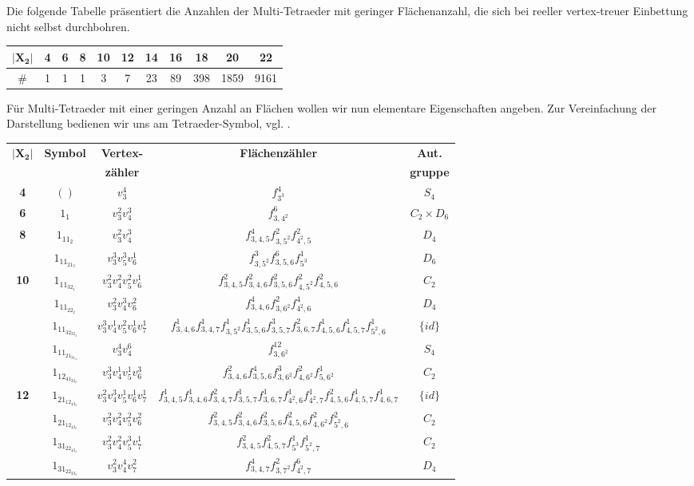 \documentclass[12pt,titlepage,twoside,cleardoublepage]{article}
\theoremstyle{nummermitklammern}
\numberwithin{equation}{section}
\begin{document}
Die folgende Tabelle präsentiert die Anzahlen der Multi-Tetraeder mit geringer Flächenanzahl, die sich bei reeller vertex-treuer Einbettung nicht selbst durchbohren.  
\begin{center}
\begin{tabular}{|c|c|c|c|c|c|c|c|c|c|c|}
\hline
$\vert\textbf{X}_{\textbf{2}}\vert$&\textbf{4}&\textbf{6}&\textbf{8}&\textbf{10}&\textbf{12}&\textbf{14}&\textbf{16}&\textbf{18}&\textbf{20}&\textbf{22}\\
\hline
$\#$&1&1&1&3&7&23&89&398&1859&9161\\
\hline
\end{tabular}
\end{center} 
Für Multi-Tetraeder mit einer geringen Anzahl an Flächen wollen wir nun elementare Eigenschaften angeben. Zur Vereinfachung der Darstellung bedienen wir uns am Tetraeder-Symbol, vgl. \cite{simp}.
\begin{center}
{\footnotesize
\begin{tabular}[h]{|c|c|c|c|c|}
\hline
$\vert\textbf{X}_{\textbf{2}}\vert$ & \textbf{Symbol} & \textbf{Vertex-}& \textbf{Flächenzähler} & \textbf{Aut.} \\
 &&\textbf{zähler}&& \textbf{gruppe}\\
\hline
\textbf{4} & $()$ &$v_3^4$ & $f_{3^3}^4$ &$S_4$\\
\hline
\textbf{6} & $1_1$ & $v_3^2v_4^3$&$f^6_{3,4^2}$ &$C_2\times D_6$\\
\hline
\textbf{8} & $1_11_2$&$ v_3^2v_4^3$& $f^4_{3,4,5}f^2_{3,5^2}f^2_{4^2,5}$ & $D_4$\\
\hline  
  & $1_11_21_3$ & $v_3^3v_5^3v_6^1$& $f^3_{3,5^2}f^6_{3,5,6}f^1_{5^3}$ &$D_6$\\
\textbf{10}& $1_11_32_1$ &$v_3^2v_4^2v_5^2v_6^1$ & $f^2_{3,4,5}f^2_{3,4,6}f^2_{3,5,6}f^2_{4,5^2}f^2_{4,5,6}$ & $C_2$\\
  & $1_11_22_2$ &$v_3^2v_4^3v_6^2$& $f^4_{3,4,6}f^2_{3,6^2}f^4_{4^2,6}$ &$D_4$\\
\hline
  & $1_11_32_32_2$&$v_3^3v_4^1v_5^2v_6^1v_7^1$& $f^1_{3,4,6}f^1_{3,4,7}f^1_{3,5^2}f^1_{3,5,6}f^3_{3,5,7}f^2_{3,6,7}f^1_{4,5,6}f^1_{4,5,7}f^1_{5^2,6}$ &$\{id\}$\\
  & $1_11_21_31_4$& $v_3^4v_4^6$& $f^{12}_{3,6^2}$ &$S_4$\\
  & $1_12_41_32_2$&$v_3^3v_4^1v_5^1v_6^3$& $f^2_{3,4,6}f^4_{3,5,6}f^3_{3,6^2}f^2_{4,6^2}f^1_{5,6^2}$ & $C_2$\\
\textbf{12}& $1_21_12_43_2$&$v_3^2v_4^3v_5^1v_6^1v_7^1$& $f^1_{3,4,5}f^1_{3,4,6}f^2_{3,4,7}f^1_{3,5,7}f^1_{3,6,7}f^1_{4^2,6}f^1_{4^2,7}f^2_{4,5,6}f^1_{4,5,7}f^1_{4,6,7}$ &$\{id\}$\\
  & $1_21_12_43_3$& $v_3^2v_4^2v_5^2v_6^2$& $f^2_{3,4,5}f^2_{3,4,6}f^2_{3,5,6}f^2_{4,5,6}f^2_{4,6^2}f^2_{5^2,6}$&$C_2$\\
  & $1_31_22_43_4$& $v_3^2v_4^2v_5^3v_7^1$& $f^2_{3,4,5}f^2_{4,5,7}f^1_{5^3}f^1_{5^2,7}$&$C_2$\\
  & $1_31_22_23_3$& $v_3^2v_4^4v_7^2$&$f^4_{3,4,7}f^2_{3,7^2}f^6_{4^2,7}$ &$D_4$\\
 \hline
\end{tabular}
}
\end{center}
\end{document}

